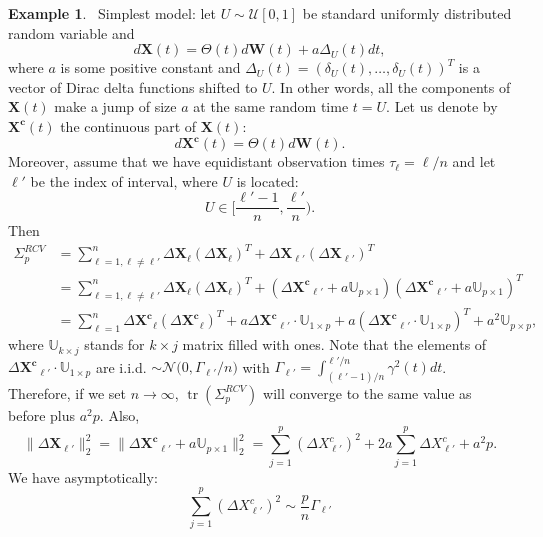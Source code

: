 \documentclass[a4paper,11pt]{book}
\theoremstyle{plain}
\theoremstyle{definition}
\newtheorem{exmp}[thm]{Example}
\newcommand{\tr}{\operatorname{tr}}
\begin{document}
    \begin{exmp} \label{uniform jumps} \
    		Simplest model: let $U \sim \mathcal{U}[0, 1]$ be standard uniformly distributed random variable and
    		\begin{equation}
    		d\mathbf{X}(t) = \Theta(t)  d\mathbf{W}(t) + a\Delta_U(t)dt,
    		\end{equation}
    		where $a$ is some positive constant and $\Delta_U(t) = (\delta_U(t), \dots, \delta_U(t))^T$ is a vector of Dirac delta functions shifted to $U$. In other words, all the components of $\mathbf{X}(t)$ make a jump of size $a$ at the same random time $t = U$. Let us denote by $\mathbf{X^c}(t)$ the continuous part of $\mathbf{X}(t)$:
    		\[ d\mathbf{X^c}(t) = \Theta(t) d\mathbf{W}(t). \]
    		Moreover, assume that we have equidistant observation times $\tau_{\ell} = \ell / n$ and let $\ell'$ be the index of interval, where $U$ is located:
    		\[ U \in \bigg[\frac{\ell'-1}{n}, \frac{\ell'}{n}\bigg). \]
    		Then
    		\[ 
    		\begin{aligned}
    		\Sigma_p^{RCV} & = \sum_{\ell=1, \ell \neq \ell'}^{n}\Delta \mathbf{X}_\ell(\Delta \mathbf{X}_\ell)^T + \Delta \mathbf{X}_{\ell'}(\Delta \mathbf{X}_{\ell'})^T\\
    		& = \sum_{\ell=1, \ell \neq \ell'}^{n}\Delta \mathbf{X}_\ell(\Delta \mathbf{X}_\ell)^T + (\Delta \mathbf{X^c}_{\ell'} + a\mathbb{U}_{p \times 1})(\Delta \mathbf{X^c}_{\ell'} + a\mathbb{U}_{p \times 1})^T\\
    		& =  \sum_{\ell=1}^{n}\Delta \mathbf{X^c}_\ell(\Delta \mathbf{X^c}_\ell)^T + a\Delta \mathbf{X^c}_{\ell'} \cdot \mathbb{U}_{1 \times p} + a(\Delta \mathbf{X^c}_{\ell'} \cdot \mathbb{U}_{1 \times p})^T + a^2\mathbb{U}_{p \times p} ,
    		\end{aligned}
    		\]
    		where $\mathbb{U}_{k \times j}$ stands for $k \times j$ matrix filled with ones. Note that the elements of $\Delta \mathbf{X^c}_{\ell'} \cdot \mathbb{U}_{1 \times p}$ are i.i.d. $ \sim \mathcal{N}\big(0, \Gamma_{\ell'}/n )$ with $\Gamma_{\ell'}=\int_{(\ell' - 1)/n}^{\ell' / n} \gamma^2(t) dt$. Therefore, if we set $n \rightarrow \infty$, $\tr(\Sigma_p^{RCV})$ will converge to the same value as before plus $a^2p$. Also,
    		\[
    		\| \Delta \mathbf{X}_{\ell'} \|_2^2 = \| \Delta \mathbf{X^c}_{\ell'} + a\mathbb{U}_{p \times 1} \|_2^2  = \sum_{j=1}^{p} (\Delta X^c_{\ell'})^2 + 2a\sum_{j=1}^{p} \Delta X^c_{\ell'} + a^2p.
    		\]
    		We have asymptotically:
    		\[
    		\sum_{j=1}^{p} (\Delta X^c_{\ell'})^2 \sim \frac{p}{n}\Gamma_{\ell'}
\]
\end{exmp}
\end{document}

